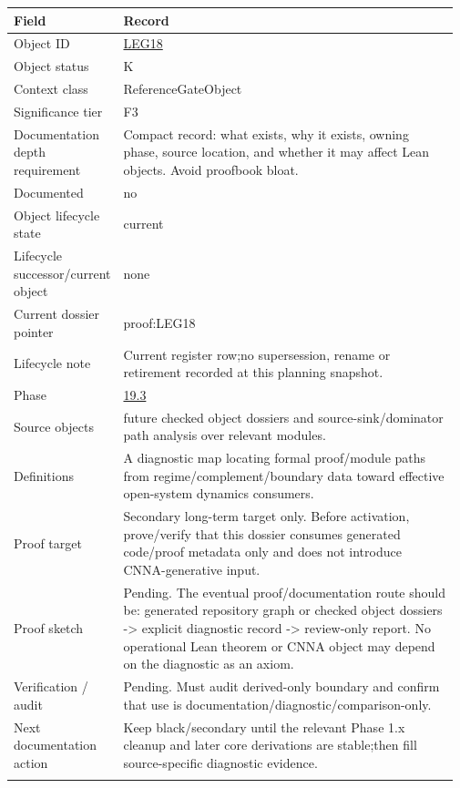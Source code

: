 \begin{longtable}{L{0.16\linewidth} L{0.81\linewidth}}
\hline
\textbf{Field} & \textbf{Record}\\
\hline
Object ID & \hyperlink{object-row-LEG18}{LEG18}\\
\hline\addlinespace[0.20em]
Object status & K\\
\hline\addlinespace[0.20em]
Context class & ReferenceGateObject\\
\hline\addlinespace[0.20em]
Significance tier & F3\\
\hline\addlinespace[0.20em]
Documentation depth requirement & Compact record: what exists, why it exists, owning phase, source location, and whether it may affect Lean objects. Avoid proofbook bloat.\\
\hline\addlinespace[0.20em]
Documented & no\\
\hline\addlinespace[0.20em]
Object lifecycle state & current\\
\hline\addlinespace[0.20em]
Lifecycle successor/\allowbreak{}current object & none\\
\hline\addlinespace[0.20em]
Current dossier pointer & proof:LEG18\\
\hline\addlinespace[0.20em]
Lifecycle note & Current register row;\newline no supersession, rename or retirement recorded at this planning snapshot.\\
\hline\addlinespace[0.20em]
Phase & \hyperlink{phase-row-19-3}{19.3}\\
\hline\addlinespace[0.20em]
Source objects & future checked object dossiers and source-sink/\allowbreak{}dominator path analysis over relevant modules.\\
\hline\addlinespace[0.20em]
Definitions & A diagnostic map locating formal proof/\allowbreak{}module paths from regime/\allowbreak{}complement/\allowbreak{}boundary data toward effective open-system dynamics consumers.\\
\hline\addlinespace[0.20em]
Proof target & Secondary long-term target only. Before activation, prove/\allowbreak{}verify that this dossier consumes generated code/\allowbreak{}proof metadata only and does not introduce CNNA-generative input.\\
\hline\addlinespace[0.20em]
Proof sketch & Pending. The eventual proof/\allowbreak{}documentation route should be: generated repository graph or checked object dossiers -> explicit diagnostic record -> review-only report. No operational Lean theorem or CNNA object may depend on the diagnostic as an axiom.\\
\hline\addlinespace[0.20em]
Verification /\allowbreak{} audit & Pending. Must audit derived-only boundary and confirm that use is documentation/\allowbreak{}diagnostic/\allowbreak{}comparison-only.\\
\hline\addlinespace[0.20em]
Next documentation action & Keep black/\allowbreak{}secondary until the relevant Phase 1.x cleanup and later core derivations are stable;\newline then fill source-specific diagnostic evidence.\\
\hline\addlinespace[0.20em]
\end{longtable}
